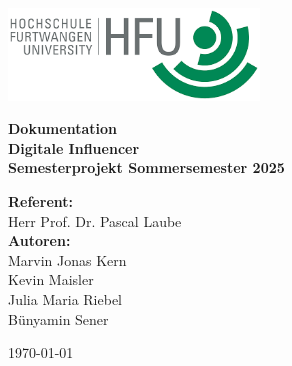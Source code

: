 \documentclass[a4paper,12pt]{article}
\begin{document}
\sloppy

\begin{titlepage}
    \centering
    \begin{flushright}
        \includegraphics[width=0.5\textwidth]{images/HFU-Logo.png}
    \end{flushright}
    
    \vspace{4cm}
    
    {\Large \textbf{Dokumentation}}\\[0.5cm]
    {\huge \textbf{Digitale Influencer}}\\[1.5cm]
    
    \textbf{Semesterprojekt Sommersemester 2025}
    
    \vfill
    
    \begin{flushleft}
    \textbf{Referent:} \\
    Herr Prof. Dr. Pascal Laube\\[2.5cm]
    
    \textbf{Autoren:} \\
    Marvin Jonas Kern \\
    Kevin Maisler \\
    Julia Maria Riebel \\
    Bünyamin Sener \\
    \end{flushleft}
    
    \vfill
    \begin{center}
        {\large \today}
    \end{center}
\end{titlepage}

\renewcommand*\contentsname{Inhaltsverzeichnis}
\tableofcontents
\newpage
\end{document}
